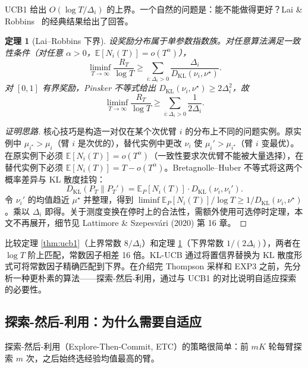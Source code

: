 \documentclass[UTF8,a4paper,11pt,zihao=5]{ctexart}
\newtheorem{theorem}{定理}[section]
\newcommand{\E}{\mathbb{E}}
\newcommand{\KL}{D_{\mathrm{KL}}}
\newcommand{\regret}[1]{R_{#1}}
\begin{document}
UCB1 给出 $O(\log T / \Delta_i)$ 的上界。一个自然的问题是：能不能做得更好？Lai \& Robbins~\cite{lai1985} 的经典结果给出了回答。

\begin{theorem}[Lai--Robbins 下界]\label{thm:lr}
设奖励分布属于单参数指数族。对任意算法满足一致性条件（对任意 $\alpha > 0$，$\E[N_i(T)] = o(T^{\alpha})$），
\begin{equation}
    \liminf_{T \to \infty} \frac{\regret{T}}{\log T} \geq \sum_{i: \Delta_i > 0} \frac{\Delta_i}{\KL(\nu_i, \nu^\star)}.
\end{equation}
对 $[0,1]$ 有界奖励，Pinsker 不等式给出 $\KL(\nu_i, \nu^\star) \geq 2 \Delta_i^2$，故
\begin{equation}
    \liminf_{T \to \infty} \frac{\regret{T}}{\log T} \geq \sum_{i: \Delta_i > 0} \frac{1}{2\Delta_i}.
\end{equation}
\end{theorem}

\begin{proof}[证明思路]
核心技巧是构造一对仅在某个次优臂 $i$ 的分布上不同的问题实例。原实例中 $\mu_{i^\star} > \mu_i$（臂 $i$ 是次优的），替代实例中更改 $\nu_i$ 使 $\mu_i' > \mu_{i^\star}$（臂 $i$ 变最优）。在原实例下必须 $\E[N_i(T)] = o(T^\alpha)$（一致性要求次优臂不能被大量选择），在替代实例下必须 $\E[N_i(T)] = T - o(T^\alpha)$。Bretagnolle--Huber 不等式将这两个概率差异与 KL 散度挂钩：
\begin{equation}
    \KL(P_T \| P_T') = \E_P[N_i(T)] \cdot \KL(\nu_i, \nu_i').
\end{equation}
令 $\nu_i'$ 的均值趋近 $\mu^\star$ 并整理，得到 $\liminf \E_P[N_i(T)] / \log T \ge 1/\KL(\nu_i, \nu^\star)$。乘以 $\Delta_i$ 即得。关于测度变换在停时上的合法性，需额外使用可选停时定理，本文不再展开，细节见 Lattimore \& Szepesvári (2020) 第 16 章。
\end{proof}

比较定理 \ref{thm:ucb1}（上界常数 $8/\Delta_i$）和定理 \ref{thm:lr}（下界常数 $1/(2\Delta_i)$），两者在 $\log T$ 阶上匹配，常数因子相差 16 倍。KL-UCB 通过将置信界替换为 KL 散度形式可将常数因子精确匹配到下界。在介绍完 Thompson 采样和 EXP3 之前，先分析一种更朴素的算法——探索-然后-利用，通过与 UCB1 的对比说明自适应探索的必要性。

\subsection{探索-然后-利用：为什么需要自适应}

探索-然后-利用（Explore-Then-Commit, ETC）的策略很简单：前 $mK$ 轮每臂探索 $m$ 次，之后始终选经验均值最高的臂。
\end{document}
